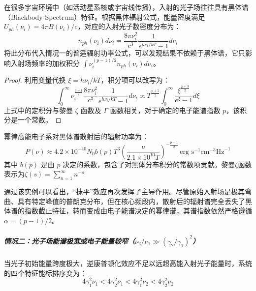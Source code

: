\begin{example}[幂律电子系对黑体辐射场的散射]
在很多宇宙环境中（如活动星系核或宇宙线传播），入射的光子场往往具有黑体谱（Blackbody Spectrum）特征。根据黑体辐射公式，能量密度满足 $U_{ph}(\nu_i) = 4\pi B(\nu_i)/c$，对应的入射光子数密度分布为：
\begin{equation}
    n_{ph}(\nu_i) d\nu_i = \frac{8\pi \nu_i^2}{c^3} \frac{1}{e^{h\nu_i/kT} - 1} d\nu_i
\end{equation}
将此分布代入情况一的普适辐射功率公式，可以发现结果不依赖于黑体谱，它只影响入射场频率的加权积分 $\int \nu_i^{(p-1)/2} n_{ph}(\nu_i) d\nu_i$。

\begin{proof}
利用变量代换 $\xi = h\nu_i / kT$，积分项可以改写为：
\begin{equation}
    \int_0^{\infty} \nu_i^{\frac{p-1}{2}} \frac{8\pi \nu_i^2}{c^3} \frac{1}{e^{h\nu_i/kT}-1} d\nu_i \propto T^{\frac{p+5}{2}} \int_0^{\infty} \frac{\xi^{\frac{p+3}{2}}}{e^\xi - 1} d\xi
\end{equation}
上式中的定积分与黎曼 $\zeta$ 函数及 $\Gamma$ 函数相关，对于确定的电子能谱指数 $p$，该积分是一个常数。
\end{proof}

\begin{tcolorbox}[colframe=black, colback=white, boxrule=0.5pt, arc=0pt]
幂律高能电子系对黑体谱散射后的辐射功率为：
\begin{equation}
    P(\nu) \approx 4.2 \times 10^{-40} N_0 b(p) T^3 \left( \frac{\nu}{2.1 \times 10^{10} T} \right)^{-\frac{p-1}{2}} \, \text{erg s}^{-1} \text{cm}^{-3} \text{Hz}^{-1}
\end{equation}
其中 $b(p)$ 是由 $p$ 决定的系数，包含了对黑体分布积分的常数项贡献。黎曼$\zeta$函数表示为$\zeta(s) = \sum_{n=1}^{\infty} n^{-s}$
\end{tcolorbox}

通过该实例可以看出，“抹平”效应再次发挥了主导作用。尽管原始入射场是极其弯曲、具有特定峰值的普朗克分布，但在核心频段内，散射后的辐射谱完全丢失了黑体谱的指数截止特征，转而变成由电子能谱决定的幂律谱，其谱指数依然严格遵循 $\alpha = (p-1)/2$。
\end{example}

\subparagraph{情况二：光子场能谱极宽或电子能量较窄（$\nu_2/\nu_1 \gg \left(\gamma_2/\gamma_1\right)^2$）}
当光子初始能量跨度极大，逆康普顿化效应不足以远超高能入射光子能量时，系统的四个特征能标排序变为：
\begin{equation}
    4\gamma_1^2\nu_1 < 4\gamma_2^2\nu_1 < 4\gamma_1^2\nu_2 < 4\gamma_2^2\nu_2
\end{equation}


